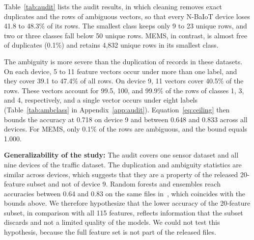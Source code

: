 Table~\ref{tab:audit} lists the audit results, in which cleaning removes exact duplicates and the rows of ambiguous vectors, so that every N-BaIoT device loses 41.8 to 48.3\% of its rows. The smallest class keeps only 9 to 23 unique rows, and two or three classes fall below 50 unique rows. MEMS, in contrast, is almost free of duplicates (0.1\%) and retains 4,832 unique rows in its smallest class.


The ambiguity is more severe than the duplication of records in these datasets. On each device, 5 to 11 feature vectors occur under more than one label, and they cover 39.1 to 47.4\% of all rows. On device 9, 11 vectors cover 40.5\% of the rows. These vectors account for 99.5, 100, and 99.9\% of the rows of classes 1, 3, and 4, respectively, and a single vector occurs under eight labels (Table~\ref{tab:ambclass} in Appendix~\ref{app:audit}). Equation~\eqref{eq:ceiling} then bounds the accuracy at 0.718 on device 9 and between 0.648 and 0.833 across all devices. For MEMS, only 0.1\% of the rows are ambiguous, and the bound equals 1.000.

\textbf{Generalizability of the study:} The audit covers one sensor dataset and all nine devices of the traffic dataset. The duplication and ambiguity statistics are similar across devices, which suggests that they are a property of the released 20-feature subset and not of device 9. Random forests and ensembles reach accuracies between 0.64 and 0.83 on the same files in~\cite{gummadi2024xaiiot}, which coincides with the bounds above. We therefore hypothesize that the lower accuracy of the 20-feature subset, in comparison with all 115 features, reflects information that the subset discards and not a limited quality of the models. We could not test this hypothesis, because the full feature set is not part of the released files.
